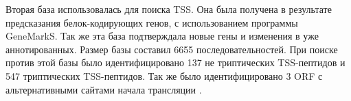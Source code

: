Вторая база использовалась для поиска TSS. Она была получена в результате  предсказания белок-кодирующих генов, с использованием программы GeneMarkS. Так же эта база подтверждала новые гены и изменения в уже аннотированных. Размер базы составил 6655 последовательностей. При поиске против этой базы было идентифицировано 137 не триптических TSS-пептидов и 547 триптических TSS-пептидов. Так же было идентифицировано 3 ORF с альтернативными сайтами начала трансляции \cite{potgieter2016proteogenomic}. 



\newpage
